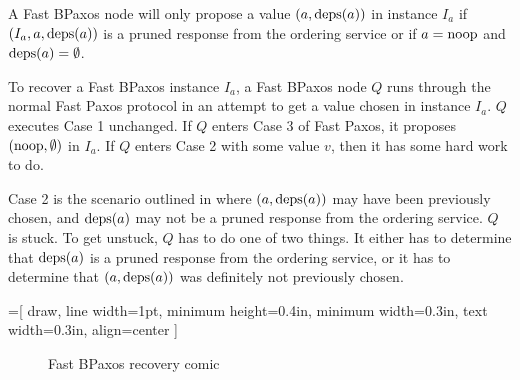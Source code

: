 \begin{boxedinvariant}
  A Fast BPaxos node will only propose a value $(a, \text{deps}(a))$ in instance
  $I_a$ if $(I_a, a, \text{deps}(a))$ is a pruned response from the ordering service
  or if $a = \text{noop}$ and $\text{deps}(a) = \emptyset$.
\end{boxedinvariant}

To recover a Fast BPaxos instance $I_a$, a Fast BPaxos node $Q$ runs through
the normal Fast Paxos protocol in an attempt to get a value chosen in instance
$I_a$. $Q$ executes Case 1 unchanged. If $Q$ enters Case 3 of Fast Paxos, it
proposes $(\text{noop}, \emptyset)$ in $I_a$. If $Q$ enters Case 2 with some value
$v$, then it has some hard work to do.

Case 2 is the scenario outlined in  where $(a, \text{deps}(a))$
may have been previously chosen, and $\text{deps}(a)$ may not be a pruned response
from the ordering service. $Q$ is stuck. To get unstuck, $Q$ has to do one of
two things. It either has to determine that $\text{deps}(a)$ is a pruned response
from the ordering service, or it has to determine that $(a, \text{deps}(a))$ was
definitely not previously chosen.

=[%
  draw,
  line width=1pt,
  minimum height=0.4in,
  minimum width=0.3in,
  text width=0.3in,
  align=center
]
\begin{figure}[ht]
  \centering
  \caption{Fast BPaxos recovery comic}
\end{figure}

